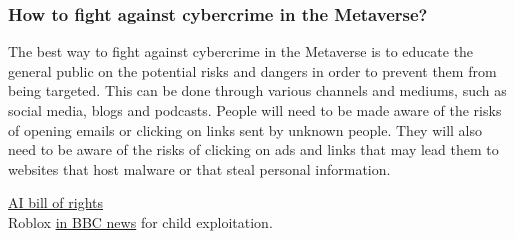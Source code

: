 \subsubsection{How to fight against cybercrime in the Metaverse?}
The best way to fight against cybercrime in the Metaverse is to educate the general public on the potential risks and dangers in order to prevent them from being targeted. This can be done through various channels and mediums, such as social media, blogs and podcasts. People will need to be made aware of the risks of opening emails or clicking on links sent by unknown people. They will also need to be aware of the risks of clicking on ads and links that may lead them to websites that host malware or that steal personal information.

\href{https://www.whitehouse.gov/ostp/ai-bill-of-rights/}{AI bill of rights}\\

Roblox \href{https://www.bbc.co.uk/news/technology-48450604}{in BBC news} for child exploitation.


